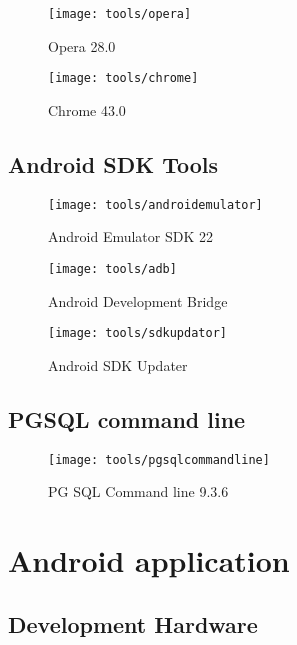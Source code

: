 \begin{figure}[h]
    \centering
    \texttt{[image: tools/opera]}
    \caption{Opera 28.0}
    \label{fig:opera_image}
\end{figure} 
\noindent

\begin{figure}[h]
    \centering
    \texttt{[image: tools/chrome]}
    \caption{Chrome 43.0}
    \label{fig:opera_image}
\end{figure} 
\noindent

\subsection*{Android SDK Tools}

\begin{figure}[h]
    \centering
    \texttt{[image: tools/androidemulator]}
    \caption{Android Emulator SDK 22}
    \label{fig:android_emulator}
\end{figure} 
\noindent

\begin{figure}[h]
    \centering
    \texttt{[image: tools/adb]}
    \caption{Android Development Bridge}
    \label{fig:adb_image}
\end{figure} 
\noindent

\begin{figure}[h]
    \centering
    \texttt{[image: tools/sdkupdator]}
    \caption{Android SDK Updater}
    \label{fig:sdk_updator}
\end{figure} 
\noindent


\subsection*{PGSQL command line}

\begin{figure}[h]
    \centering
    \texttt{[image: tools/pgsqlcommandline]}
    \caption{PG SQL Command line 9.3.6}
    \label{fig:pg_sql_image}
\end{figure} 
\noindent


\section{Android application}

\subsection{Development Hardware}

